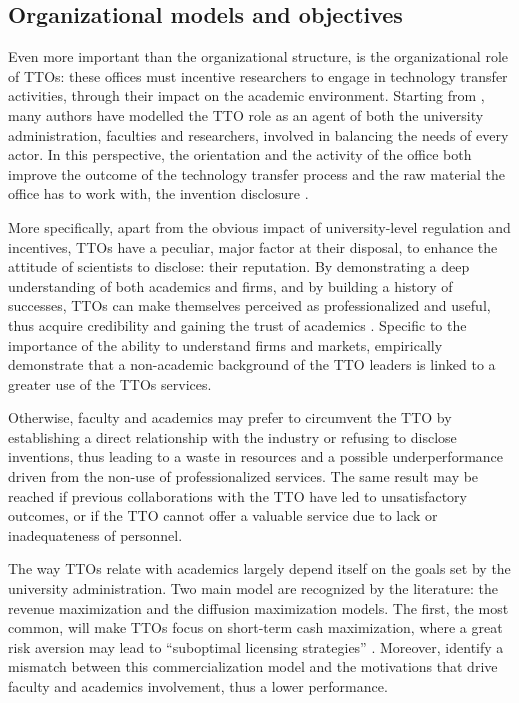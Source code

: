 \subsection{Organizational models and objectives}

Even more important than the organizational structure, is the organizational role of TTOs: these offices must incentive researchers to engage in technology transfer activities, through their impact on the academic environment. Starting from \citet{Jensen1998}, many authors have modelled the TTO role as an agent of both the university administration, faculties and researchers, involved in balancing the needs of every actor. In this perspective, the orientation and the activity of the office both improve the outcome of the technology transfer process and the raw material the office has to work with, the invention disclosure \citep{Siegel2007}. 

More specifically, apart from the obvious impact of university-level regulation and incentives, TTOs have a peculiar, major factor at their disposal, to enhance the attitude of scientists to disclose: their reputation. By demonstrating a deep understanding of both academics and firms, and by building a history of successes, TTOs can make themselves perceived as professionalized and useful, thus acquire credibility and gaining the trust of academics \citep{OwenSmith2001}. Specific to the importance of the ability to understand firms and markets, \citet{Muscio2010} empirically demonstrate that a non-academic background of the TTO leaders is linked to a greater use of the TTOs services.

Otherwise, faculty and academics may prefer to circumvent the TTO by establishing a direct relationship with the industry or refusing to disclose inventions, thus leading to a waste in resources and a possible underperformance driven from the non-use of professionalized services. The same result may be reached if previous collaborations with the TTO have led to unsatisfactory outcomes, or if the TTO cannot offer a valuable service due to lack or inadequateness of personnel. 

The way TTOs relate with academics largely depend itself on the goals set by the university administration. Two main model are recognized by the literature: the revenue maximization and the diffusion maximization models. The first, the most common, will make TTOs focus on short-term cash maximization, where a great risk aversion may lead to \enquote{suboptimal licensing strategies} \citep{Markman2005}. Moreover, \citet{Siegel2003} identify a mismatch between this commercialization model and the motivations that drive faculty and academics involvement, thus a lower performance.

